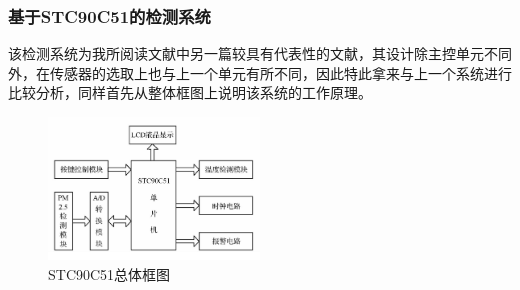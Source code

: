 \documentclass[a4paper, 11pt]{article} %
\begin{document}
\subsubsection{基于STC90C51的检测系统}
\par{} 该检测系统为我所阅读文献中另一篇较具有代表性的文献\cite{cz2016yz}，其设计除主控单元不同外，在传感器的选取上也与上一个单元有所不同，因此特此拿来与上一个系统进行比较分析，同样首先从整体框图上说明该系统的工作原理。
\begin{figure}[H]
  \centering
  \includegraphics[width = 0.5\textwidth]{1-4.png}
  \caption{STC90C51总体框图}
  \label{img4} 
\end{figure}
\end{document}
